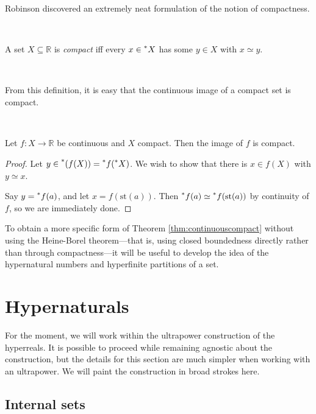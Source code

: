 \documentclass[11pt]{amsart}
\theoremstyle{remark}
\newcommand{\st}{\mathrm{st}}
\newcommand{\hyp}[1][\mathbb{R}]{\prescript{*}{}{#1}}
\newcommand{\near}{\simeq}
\begin{document}
Robinson discovered an extremely neat formulation of the notion of compactness.

\

\begin{defn}[Compactness] \label{defn:compact} A set $X \subseteq \mathbb{R}$ is \emph{compact} iff every $x \in \hyp[X]$ has some $y \in X$ with $x \near y$.
\end{defn}

\

From this definition, it is easy that the continuous image of a compact set is compact.

\

\begin{thm} \label{thm:continuouscompact} Let $f: X \to \mathbb{R}$ be continuous and $X$ compact.
Then the image of $f$ is compact.
\end{thm}
\begin{proof}
Let $y \in \hyp[(f(X)]) = \hyp[f](\hyp[X])$.
We wish to show that there is $x \in f(X)$ with $y \near x$.

Say $y = \hyp[f](a)$, and let $x = f(\st(a))$.
Then $\hyp[f](a) \near \hyp[f](\st(a))$ by continuity of $f$, so we are immediately done.
\end{proof}

To obtain a more specific form of Theorem \ref{thm:continuouscompact} without using the Heine-Borel theorem---that is, using closed boundedness directly rather than through compactness---it will be useful to develop the idea of the hypernatural numbers and hyperfinite partitions of a set.

\section{Hypernaturals} \label{sec:hypernaturals}

For the moment, we will work within the ultrapower construction of the hyperreals.
It is possible to proceed while remaining agnostic about the construction, but the details for this section are much simpler when working with an ultrapower.
We will paint the construction in broad strokes here.

\subsection{Internal sets}  \label{sec:internal}
\end{document}
